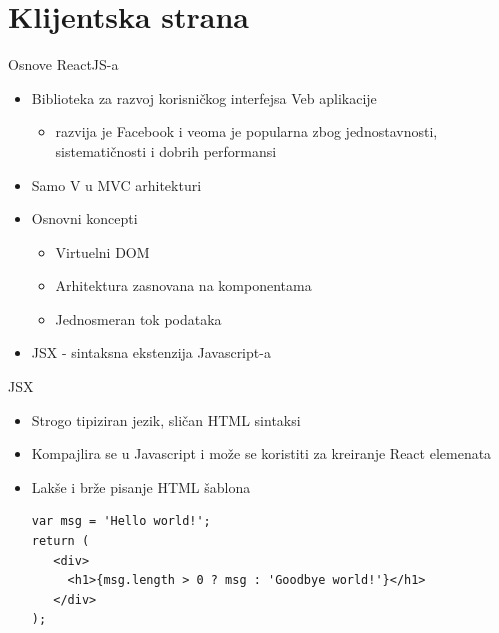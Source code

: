 \documentclass{beamer}
\begin{document}
\section{Klijentska strana}
\begin{frame}{Osnove ReactJS-a}
    \begin{itemize}
        \item Biblioteka za razvoj korisničkog interfejsa Veb aplikacije
        	\begin{itemize}
        \item razvija je Facebook i veoma je popularna zbog jednostavnosti, sistematičnosti i dobrih performansi
        	\end{itemize}
        \item Samo V u MVC arhitekturi
        \item Osnovni koncepti
        	\begin{itemize}
        		\item Virtuelni DOM
        		\item Arhitektura zasnovana na komponentama
        		\item Jednosmeran tok podataka
        	\end{itemize}
        \item JSX - sintaksna ekstenzija Javascript-a
        	
    \end{itemize}
\end{frame}
\begin{frame}[fragile]{JSX}
    \begin{itemize}
    	\item Strogo tipiziran jezik, sličan HTML sintaksi
    	\item Kompajlira se u Javascript i može se koristiti za kreiranje React elemenata
		\item Lakše i brže pisanje HTML šablona
		\begin{verbatim}
var msg = 'Hello world!';
return (
   <div>
     <h1>{msg.length > 0 ? msg : 'Goodbye world!'}</h1>
   </div>
);
		\end{verbatim}		     	
    \end{itemize}
\end{frame}
\end{document}
